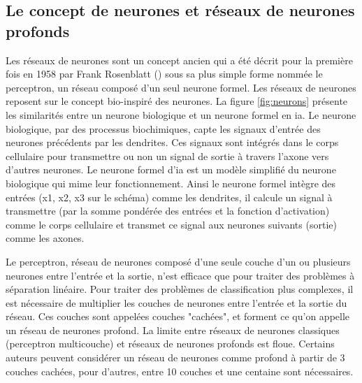 \subsection{Le concept de neurones et réseaux de neurones profonds}
Les réseaux de neurones sont un concept ancien qui a été décrit pour la première fois en 1958 par Frank Rosenblatt (\cite{rosenblatt_perceptron_1958}) sous sa plus simple forme nommée le perceptron, un réseau composé d'un seul neurone formel. Les réseaux de neurones reposent sur le concept bio-inspiré des neurones. La figure \ref{fig:neurons} présente les similarités entre un neurone biologique et un neurone formel en \gls{ia}. Le neurone biologique, par des processus biochimiques, capte les signaux d'entrée des neurones précédents par les dendrites. Ces signaux sont intégrés dans le corps cellulaire pour transmettre ou non un signal de sortie à travers l'axone vers d'autres neurones. Le neurone formel d'\gls{ia} est un modèle simplifié du neurone biologique qui mime leur fonctionnement. Ainsi le neurone formel intègre des entrées (x1, x2, x3 sur le schéma) comme les dendrites, il calcule un signal à transmettre (par la somme pondérée des entrées et la fonction d'activation) comme le corps cellulaire et transmet ce signal aux neurones suivants (sortie) comme les axones.


Le perceptron, réseau de neurones composé d'une seule couche d’un ou plusieurs neurones entre l'entrée et la sortie, n'est efficace que pour traiter des problèmes à séparation linéaire. Pour traiter des problèmes de classification plus complexes, il est nécessaire de multiplier les couches de neurones entre l'entrée et la sortie du réseau. Ces couches sont appelées couches "cachées", et forment ce qu'on appelle un réseau de neurones profond. La limite entre réseaux de neurones classiques (perceptron multicouche) et réseaux de neurones profonds est floue. Certains auteurs peuvent considérer un réseau de neurones comme profond à partir de 3 couches cachées, pour d'autres, entre 10 couches et une centaine sont nécessaires.


